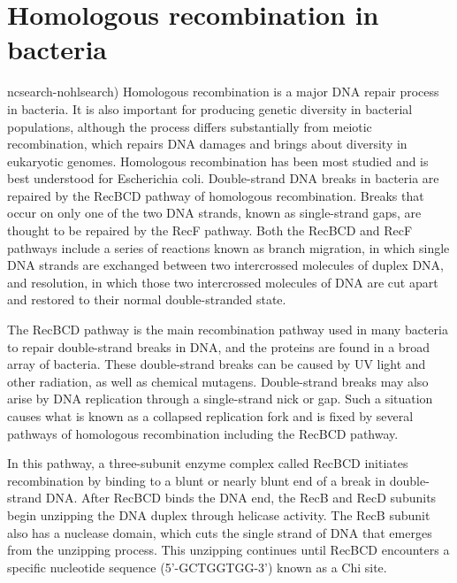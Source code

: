 \hypertarget{homologous-recombination-in-bacteria}{%
\section{Homologous recombination in bacteria}\label{homologous-recombination-in-bacteria}}

ncsearch-nohlsearch) Homologous recombination is a major DNA repair process in bacteria. It is also important for producing genetic diversity in bacterial populations, although the process differs substantially from meiotic recombination, which repairs DNA damages and brings about diversity in eukaryotic genomes. Homologous recombination has been most studied and is best understood for Escherichia coli. Double-strand DNA breaks in bacteria are repaired by the RecBCD pathway of homologous recombination. Breaks that occur on only one of the two DNA strands, known as single-strand gaps, are thought to be repaired by the RecF pathway. Both the RecBCD and RecF pathways include a series of reactions known as branch migration, in which single DNA strands are exchanged between two intercrossed molecules of duplex DNA, and resolution, in which those two intercrossed molecules of DNA are cut apart and restored to their normal double-stranded state.

The RecBCD pathway is the main recombination pathway used in many bacteria to repair double-strand breaks in DNA, and the proteins are found in a broad array of bacteria. These double-strand breaks can be caused by UV light and other radiation, as well as chemical mutagens. Double-strand breaks may also arise by DNA replication through a single-strand nick or gap. Such a situation causes what is known as a collapsed replication fork and is fixed by several pathways of homologous recombination including the RecBCD pathway.

In this pathway, a three-subunit enzyme complex called RecBCD initiates recombination by binding to a blunt or nearly blunt end of a break in double-strand DNA. After RecBCD binds the DNA end, the RecB and RecD subunits begin unzipping the DNA duplex through helicase activity. The RecB subunit also has a nuclease domain, which cuts the single strand of DNA that emerges from the unzipping process. This unzipping continues until RecBCD encounters a specific nucleotide sequence (5'-GCTGGTGG-3') known as a Chi site.

